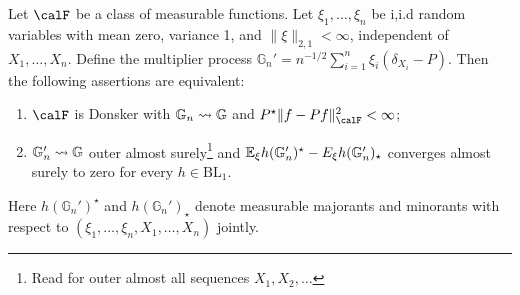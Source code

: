 \begin{theorem}
	\label{thm:conditional-multiplier-clt}
	Let \(\calF\) be a class of measurable functions. Let \(\xi_1,\dots,\xi_n\) be i,i.d random variables with mean zero, variance 1, and \(\|\xi\|_{2,1}<\infty\), independent of \(X_1,\dots,X_n\). Define the multiplier process \(\mathbb{G}_n'=n^{-1/2}\sum_{i=1}^n \xi_i(\delta_{X_i}-P)\). Then the following assertions are equivalent:
	\begin{enumerate}
		\item \(\calF\) is Donsker with \(\mathbb{G}_n\rightsquigarrow\mathbb{G}\) and \(P^\star\|f-Pf\|_\calF^2<\infty\);
		\item \(\mathbb{G}_n'\rightsquigarrow\mathbb{G}\) outer almost surely\footnote{Read for outer almost all sequences \(X_1,X_2,\dots\)} and \(\mathbb{E}_\xi h(\mathbb{G}_n')^\star-E_\xi h(\mathbb{G}_n')_\star\) converges almost surely to zero for every \(h\in \text{BL}_1\).
	\end{enumerate}
	Here \(h(\mathbb{G}_n')^\star\) and \(h(\mathbb{G}_n')_\star\) denote measurable majorants and minorants with respect to \(\left(\xi_1,\dots,\xi_n,X_1,\dots,X_n\right)\) jointly.
\end{theorem}


